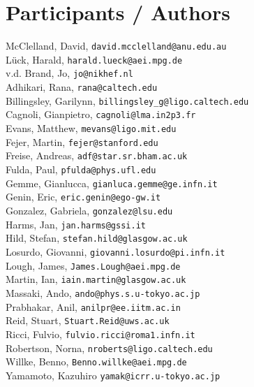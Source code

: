 \chapter{Participants / Authors}
\label{sec:Participants}


McClelland, David, \texttt{david.mcclelland@anu.edu.au}
\\
L\"uck, Harald,   \texttt{harald.lueck@aei.mpg.de} 
\\
v.d. Brand, Jo, \texttt{jo@nikhef.nl} 
\\
Adhikari, Rana, \texttt{rana@caltech.edu}
\\
Billingsley, Garilynn, \texttt{billingsley\_g@ligo.caltech.edu}
\\
Cagnoli, Gianpietro, \texttt{cagnoli@lma.in2p3.fr}
\\
Evans, Matthew, \texttt{mevans@ligo.mit.edu}
\\
Fejer, Martin, \texttt{fejer@stanford.edu}
\\
Freise, Andreas, \texttt{adf@star.sr.bham.ac.uk}
\\
Fulda, Paul, \texttt{pfulda@phys.ufl.edu}
\\
Gemme, Gianlucca, \texttt{gianluca.gemme@ge.infn.it}
\\
Genin, Eric, \texttt{eric.genin@ego-gw.it}
\\
Gonzalez, Gabriela, \texttt{gonzalez@lsu.edu}
\\
Harms, Jan, \texttt{jan.harms@gssi.it}
\\
Hild, Stefan, \texttt{stefan.hild@glasgow.ac.uk}
\\
Losurdo, Giovanni, \texttt{giovanni.losurdo@pi.infn.it}
\\
Lough, James, \texttt{James.Lough@aei.mpg.de}
\\
Martin, Ian, \texttt{iain.martin@glasgow.ac.uk}
\\
Massaki, Ando,  \texttt{ando@phys.s.u-tokyo.ac.jp}
\\
Prabhakar, Anil, \texttt{anilpr@ee.iitm.ac.in}
\\
Reid, Stuart, \texttt{Stuart.Reid@uws.ac.uk}
\\
Ricci, Fulvio, \texttt{fulvio.ricci@roma1.infn.it}
\\
Robertson, Norna, \texttt{nroberts@ligo.caltech.edu}
\\
Willke, Benno, \texttt{Benno.willke@aei.mpg.de}
\\
Yamamoto, Kazuhiro \texttt{yamak@icrr.u-tokyo.ac.jp}

